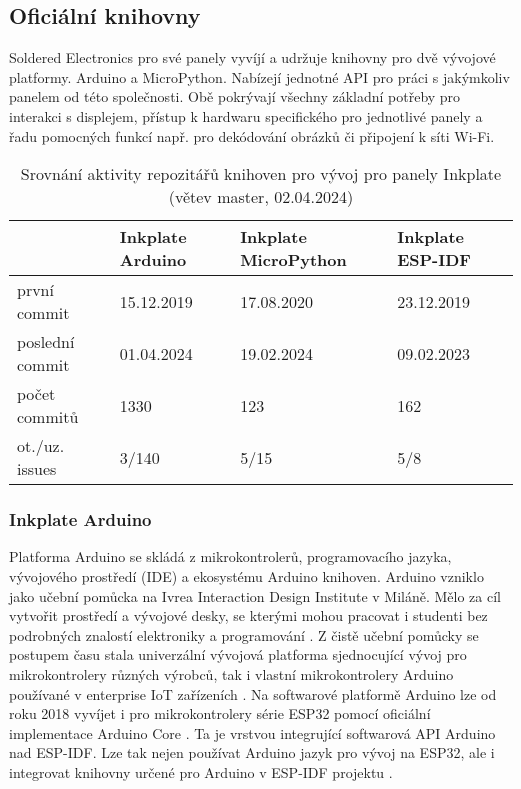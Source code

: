 \subsection{Oficiální knihovny}
Soldered Electronics pro své panely vyvíjí a udržuje knihovny pro dvě vývojové platformy. Arduino a MicroPython. Nabízejí jednotné API pro práci s jakýmkoliv panelem od této společnosti. Obě pokrývají všechny základní potřeby pro interakci s displejem, přístup k hardwaru specifického pro jednotlivé panely a řadu pomocných funkcí např. pro dekódování obrázků či připojení k síti Wi-Fi.

\begin{table}[h]
    \centering
    \caption{Srovnání aktivity repozitářů knihoven pro vývoj pro panely Inkplate (větev master, 02.04.2024)}
    \label{tab:inkplate-library-comparison}
    \begin{tabular}{llll}
        \multicolumn{1}{c}{}
            & Inkplate Arduino\cite{SolderedElectronicsInkplateArduinolibrary2024}
            & Inkplate MicroPython\cite{SolderedElectronicsInkplatemicropythonMicropython}
            & Inkplate ESP-IDF\cite{turcotteTurgu1ESPIDFInkPlate2024} \\ \hline
        první commit             & 15.12.2019 & 17.08.2020  & 23.12.2019 \\
        poslední commit          & 01.04.2024 & 19.02.2024  & 09.02.2023 \\
        počet commitů            & 1330       & 123         & 162        \\
        ot./uz. issues           & 3/140      & 5/15        & 5/8        \\ \hline
    \end{tabular}
\end{table}

\subsubsection{Inkplate Arduino}
Platforma Arduino se skládá z mikrokontrolerů, programovacího jazyka, vývojového prostředí (IDE) a ekosystému Arduino knihoven. Arduino vzniklo jako učební pomůcka na Ivrea Interaction Design Institute v Miláně. Mělo za cíl vytvořit prostředí a vývojové desky, se kterými mohou pracovat i studenti bez podrobných znalostí elektroniky a programování \cite{WhatArduino}. Z čistě učební pomůcky se postupem času stala univerzální vývojová platforma sjednocující vývoj pro mikrokontrolery různých výrobců, tak i vlastní mikrokontrolery Arduino používané v enterprise IoT zařízeních \cite{Arduino}. Na softwarové platformě Arduino lze od roku 2018 vyvíjet i pro mikrokontrolery série ESP32 pomocí oficiální implementace Arduino Core \cite{ReleasesEspressifArduinoesp32}. Ta je vrstvou integrující softwarová API Arduino nad ESP-IDF. Lze tak nejen používat Arduino jazyk pro vývoj na ESP32, ale i integrovat knihovny určené pro Arduino v ESP-IDF projektu \cite{espressifsystemsArduinoESPIDFComponent}.


